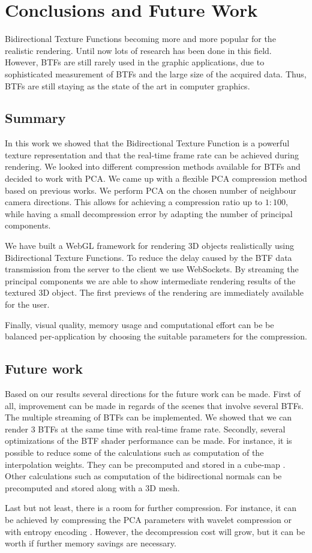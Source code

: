 \chapter{Conclusions and Future Work}
\label{chapter:conclusions}
 Bidirectional Texture Functions becoming more and more popular for the realistic rendering.
Until now lots of research has been done in this field. 
However, BTFs are still rarely used in the graphic applications, 
due to  sophisticated measurement of BTFs and the large size of the acquired data.
Thus, BTFs are still staying as the state of the art in computer graphics. 


\section{Summary}
In this work we showed that the Bidirectional Texture Function is a powerful texture representation and 
that the real-time frame rate can be achieved during rendering.
We looked into different compression methods available for BTFs and decided to work with PCA.
We came up with a flexible PCA compression method based on previous works.
We perform PCA on the chosen number of neighbour camera directions.
This allows for achieving a compression ratio up to $1:100$, while having a small decompression error by adapting the number of principal components.

We have built a WebGL framework for rendering 3D objects realistically using Bidirectional Texture Functions.
To reduce the delay caused by the BTF data transmission from the server to the client we use WebSockets.
By streaming the principal components we are able to show intermediate rendering results of the textured 3D object.
The first previews of the rendering are immediately available for the user.

Finally, visual quality, memory usage and computational effort can be be balanced  per-application by choosing the suitable parameters for the compression.


\section{Future work}
\label{section:future_work}

Based on our results several directions for the future work can be made.
First of all, improvement can be made in regards of the scenes that involve several BTFs.
The multiple streaming of BTFs can be implemented. We showed that we can render 3 BTFs at the same time with real-time frame rate.
Secondly, several optimizations of the BTF shader performance can be made.
For instance, it is possible to reduce some of the calculations such as computation of the interpolation weights. 
They can be precomputed and stored in a cube-map \cite{haindl}.
Other calculations such as computation of the bidirectional normals can be precomputed and stored along with a 3D mesh.

Last but not least, there is a room for further compression.
 For instance, it can be achieved by compressing the PCA parameters with wavelet compression \cite{webglbtfstreaming} or with entropy encoding \cite{gpu_gems}. 
However, the decompression cost will grow, but it can be worth if further memory savings are necessary. 